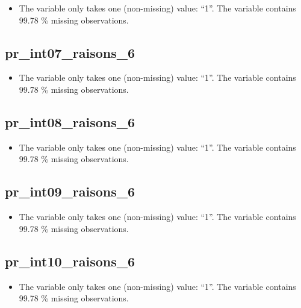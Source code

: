 \documentclass[
  letterpaper,
  DIV=11,
  numbers=noendperiod]{scrartcl}
\providecommand{\tightlist}{%
  \setlength{\itemsep}{0pt}\setlength{\parskip}{0pt}}
\begin{document}
\begin{itemize}
\tightlist
\item
  The variable only takes one (non-missing) value: ``1''. The variable
  contains 99.78 \% missing observations.
\end{itemize}

\fullline

\subsection{pr\_int07\_raisons\_6}\label{pr_int07_raisons_6}

\begin{itemize}
\tightlist
\item
  The variable only takes one (non-missing) value: ``1''. The variable
  contains 99.78 \% missing observations.
\end{itemize}

\fullline

\subsection{pr\_int08\_raisons\_6}\label{pr_int08_raisons_6}

\begin{itemize}
\tightlist
\item
  The variable only takes one (non-missing) value: ``1''. The variable
  contains 99.78 \% missing observations.
\end{itemize}

\fullline

\subsection{pr\_int09\_raisons\_6}\label{pr_int09_raisons_6}

\begin{itemize}
\tightlist
\item
  The variable only takes one (non-missing) value: ``1''. The variable
  contains 99.78 \% missing observations.
\end{itemize}

\fullline

\subsection{pr\_int10\_raisons\_6}\label{pr_int10_raisons_6}

\begin{itemize}
\tightlist
\item
  The variable only takes one (non-missing) value: ``1''. The variable
  contains 99.78 \% missing observations.
\end{itemize}
\end{document}
